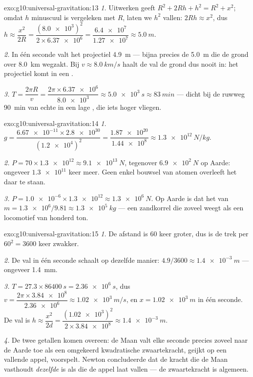 \begin{solution}{exo:g10:universal-gravitation:13}
\emph{1.} Uitwerken geeft $R^2 + 2Rh + h^2 = R^2 + x^2$; omdat $h$
minuscuul is vergeleken met $R$, laten we $h^2$ vallen:
$2Rh \approx x^2$, dus
$h \approx \dfrac{x^2}{2R}
= \dfrac{(\num{8.0e3})^2}{2 \times \num{6.37e6}}
= \dfrac{\num{6.4e7}}{\num{1.27e7}} \approx \qty{5.0}{m}$.

\emph{2.} In één seconde valt het projectiel \qty{4.9}{m} --- bijna
precies de \qty{5.0}{m} die de grond over \qty{8.0}{km} wegzakt. Bij
$v \approx \qty{8.0}{km/s}$ haalt de val de grond dus nooit in: het
projectiel komt in een .

\emph{3.} $T = \dfrac{2\pi R}{v}
= \dfrac{2\pi \times \num{6.37e6}}{\num{8.0e3}}
\approx \qty{5.0e3}{s} \approx \qty{83}{min}$ --- dicht bij de ruwweg
\qty{90}{min} van echte  in een lage , die iets hoger
vliegen.
\end{solution}

\begin{solution}{exo:g10:universal-gravitation:14}
\emph{1.} $g = \dfrac{\num{6.67e-11} \times \num{2.8e30}}
{(\num{1.2e4})^2} = \dfrac{\num{1.87e20}}{\num{1.44e8}}
\approx \qty{1.3e12}{N/kg}.$

\emph{2.} $P = 70 \times \num{1.3e12} \approx \qty{9.1e13}{N}$,
tegenover $\qty{6.9e2}{N}$ op Aarde: ongeveer $\num{1.3e11}$ keer meer.
Geen enkel bouwsel van atomen overleeft het daar te staan.

\emph{3.} $P = \num{1.0e-6} \times \num{1.3e12} \approx
\qty{1.3e6}{N}$. Op Aarde is dat het  van
$m = \num{1.3e6}/9.81 \approx \qty{1.3e5}{kg}$ --- een zandkorrel die
zoveel weegt als een locomotief van honderd ton.
\end{solution}

\begin{solution}{exo:g10:universal-gravitation:15}
\emph{1.} De afstand is $60$ keer groter, dus is de trek per 
$60^2 = 3600$ keer zwakker.

\emph{2.} De val in één seconde schaalt op dezelfde manier:
$4.9/3600 \approx \qty{1.4e-3}{m}$ --- ongeveer \qty{1.4}{mm}.

\emph{3.} $T = 27.3 \times \qty{86400}{s} = \qty{2.36e6}{s}$, dus
$v = \dfrac{2\pi \times \num{3.84e8}}{\num{2.36e6}} \approx
\qty{1.02e3}{m/s}$, en $x = \qty{1.02e3}{m}$ in één seconde. De val is
$h \approx \dfrac{x^2}{2d}
= \dfrac{(\num{1.02e3})^2}{2 \times \num{3.84e8}}
\approx \qty{1.4e-3}{m}$.

\emph{4.} De twee getallen komen overeen: de Maan valt elke seconde
precies zoveel naar de Aarde toe als een omgekeerd kwadratische
zwaartekracht, geijkt op een vallende appel, voorspelt. Newton
concludeerde dat de kracht die de Maan vasthoudt \emph{dezelfde} is als
die de appel laat vallen --- de zwaartekracht is algemeen.
\end{solution}

